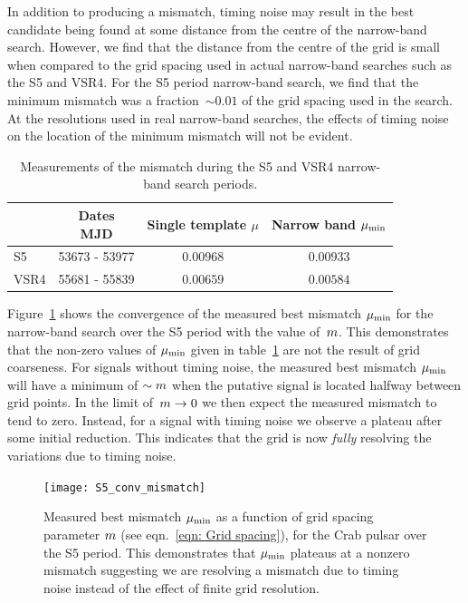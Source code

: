 \documentclass[../full_thesis/full_thesis.tex]{subfiles}
\begin{document}
In addition to producing a mismatch, timing noise may result in the best
candidate being found at some distance from the centre of the narrow-band
search.  However, we find that the distance from the centre of the grid is
small when compared to the grid spacing used in actual narrow-band searches
such as the S5 and VSR4.  For the S5 period narrow-band search, we find that
the minimum mismatch was a fraction~$\sim 0.01$ of the grid spacing used in the
\citet{ligo2008} search.  At the resolutions used in real narrow-band searches,
the effects of timing noise on the location of the minimum mismatch will not be
evident.

\begingroup
\small
\begin{table}[ht]
\centering
\begin{tabular}{lccc}
    &
    \specialcell{Dates \\ MJD} &
    \specialcell{Single  template \\ $\mu$} &
    \specialcell{Narrow band \\ $\mu_{\mathrm{min}}$} \\ \hline
S5 & 53673 - 53977 & $0.00968$ & $0.00933$ \\
VSR4 & 55681 - 55839 & $0.00659$ & $0.00584$ \\
\end{tabular}
\caption{Measurements of the mismatch during the S5 and VSR4 narrow-band search
         periods.}
\label{tab: Results}
\end{table}
\endgroup

Figure~\ref{fig: conv} shows the convergence of the measured best mismatch
$\mu_{\mathrm{min}}$ for the narrow-band search over the S5 period with the value
of~$m$.  This demonstrates that the non-zero values of $\mu_{\mathrm{min}}$ given in
table~\ref{tab: Results} are not the result of grid coarseness.  For signals
without timing noise, the measured best mismatch $\mu_{\mathrm{min}}$ will have a minimum
of $\sim m$ when the putative signal is located halfway between grid
points. In the limit of~$m \rightarrow 0$ we then expect the measured
mismatch to tend to zero. Instead, for a signal with timing noise we observe a
plateau after some initial reduction. This indicates that the grid is now
\emph{fully} resolving the variations due to timing noise.
\begin{figure}[htb]
\centering
\texttt{[image: S5\_conv\_mismatch]}
\caption{Measured best mismatch $\mu_{\mathrm{min}}$ as a function
of grid spacing parameter $m$ (see eqn.~\eqref{eqn: Grid spacing}), for the Crab pulsar over the S5 period.
    This demonstrates that $\mu_{\mathrm{min}}$ plateaus at a nonzero mismatch suggesting
    we are resolving a mismatch due to timing noise instead of the effect of finite
    grid resolution.}
\label{fig: conv}
\end{figure}
\end{document}
